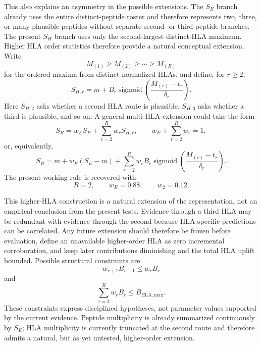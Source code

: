 \documentclass[11pt]{article}
\newcommand{\sigmoid}{\operatorname{sigmoid}}
\begin{document}
This also explains an asymmetry in the possible extensions. The $S_E$ branch
already uses the entire distinct-peptide roster and therefore represents two,
three, or many plausible peptides without separate second- or third-peptide
branches. The present $S_H$ branch uses only the second-largest distinct-HLA
maximum. Higher HLA order statistics therefore provide a natural conceptual
extension. Write
\begin{equation}
M_{(1)}\geq M_{(2)}\geq\cdots\geq M_{(R)}
\end{equation}
for the ordered maxima from distinct normalized HLAs, and define, for
$r\geq2$,
\begin{equation}
S_{H,r}
=m+B_r\sigmoid\left(\frac{M_{(r)}-t_r}{\delta_r}\right).
\label{eq:posttest-higher-hla-branch}
\end{equation}
Here $S_{H,2}$ asks whether a second HLA route is plausible, $S_{H,3}$ asks
whether a third is plausible, and so on. A general multi-HLA extension could take the
form
\begin{equation}
S_R=w_E S_E+\sum_{r=2}^{R}w_rS_{H,r},
\qquad
w_E+\sum_{r=2}^{R}w_r=1,
\label{eq:posttest-multihla-convex}
\end{equation}
or, equivalently,
\begin{equation}
S_R
=m+w_E(S_E-m)
+\sum_{r=2}^{R}w_rB_r
\sigmoid\left(\frac{M_{(r)}-t_r}{\delta_r}\right).
\label{eq:posttest-multihla-expanded}
\end{equation}
The present working rule is recovered with
\begin{equation}
R=2,
\qquad w_E=0.88,
\qquad w_2=0.12.
\end{equation}

This higher-HLA construction is a natural extension of the representation,
not an empirical conclusion from the present tests. Evidence through a third
HLA may be redundant with evidence through the second because HLA-specific
predictions can be correlated. Any future extension should therefore be
frozen before evaluation, define an unavailable higher-order HLA as zero
incremental corroboration, and keep later contributions diminishing and the
total HLA uplift bounded. Possible structural constraints are
\begin{equation}
w_{r+1}B_{r+1}\leq w_rB_r
\end{equation}
and
\begin{equation}
\sum_{r=2}^{R}w_rB_r\leq B_{\mathrm{HLA,max}}.
\end{equation}
These constraints express disciplined hypotheses, not parameter values
supported by the current evidence. Peptide multiplicity is already summarized
continuously by $S_E$; HLA multiplicity is currently truncated at the second
route and therefore admits a natural, but as yet untested, higher-order
extension.
\end{document}
